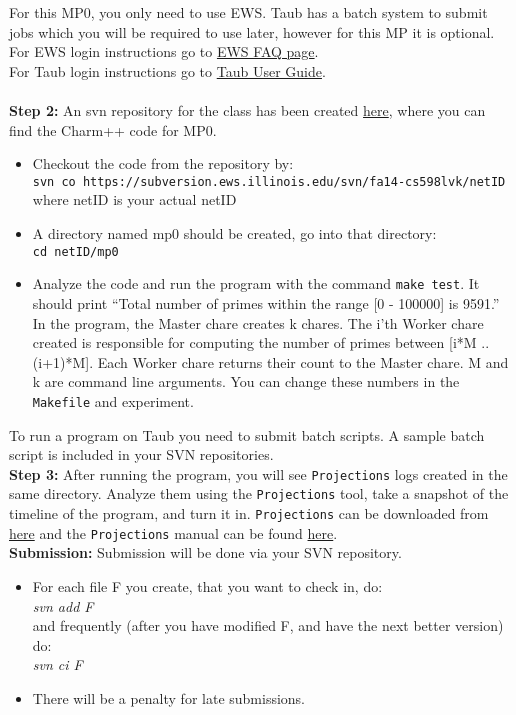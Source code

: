 \documentclass{article}
\begin{document}
For this MP0, you only need to use EWS. Taub has a batch
system to submit jobs which you will be required to use later, however for this MP
it is optional.\\
For EWS login instructions go to
\href{http://it.engineering.illinois.edu/ews/lab-information/ews-faq}{EWS FAQ page}.\\
For Taub login instructions go to
\href{https://campuscluster.illinois.edu/user\_info/doc/}{Taub User Guide}.\\
\\
\textbf{Step 2:} An svn repository for the class has been created
\href{https://subversion.ews.illinois.edu/svn/fa14-cs598lvk/}{here},
where you can find the Charm++ code for MP0.\\
\begin{itemize}
\item Checkout the code from the repository by:\\
        \texttt{svn co
        https://subversion.ews.illinois.edu/svn/fa14-cs598lvk/netID}\\
        where netID is your actual netID
\item A directory named mp0 should be created, go into that directory:\\
        \texttt{cd netID/mp0}
\item Analyze the code and run the program with the command \texttt{make test}.
It should print ``Total number of primes within the range [0 - 100000] is 9591.''
In the program, the Master chare creates k chares.
The i'th Worker chare created is responsible for computing the number of primes between [i*M .. (i+1)*M].
Each Worker chare returns their count to the Master chare.
M and k are command line arguments.
You can change these numbers in the \texttt{Makefile} and experiment.

\end{itemize}
    To run a program on Taub you need to submit batch scripts.
    A sample batch script is included in your SVN repositories.\\

\textbf{Step 3:}  After running the program, you will see \texttt{Projections}
logs created in the same directory.
Analyze them using the \texttt{Projections} tool,
take a snapshot of the timeline of the program, and turn it in.
\texttt{Projections} can be downloaded from \href{http://charm.cs.uiuc.edu/software}{here} and the
\texttt{Projections} manual can be found
\href{http://charm.cs.illinois.edu/manuals/html/projections/manual-1p.html}
{here}.\\

\textbf{Submission:}
Submission will be done via your SVN repository.
\begin{itemize}
\item  For each file F you create, that you want to check in, do: \\
        \textit{svn add F}\\
        and frequently (after you have modified F, and have the next better
        version) do:\\ 
        \textit{svn ci F}
\item  There will be a penalty for late submissions.
\end{itemize}
\end{document}
